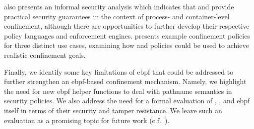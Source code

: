  also presents an informal security analysis which indicates that
\bpfbox{} and \bpfcontain{} provide practical security guarantees in the context of
process- and container-level confinement, although there are opportunities to further
develop their respective policy languages and enforcement engines. 
presents example confinement policies for three distinct use cases, examining how
\bpfbox{} and \bpfcontain{} policies could be used to achieve realistic confinement goals.

Finally, we identify some key limitations of \gls{ebpf} that could be addressed to further
strengthen an \gls{ebpf}-based confinement mechanism. Namely, we highlight the need for
new \gls{ebpf} helper functions to deal with pathname semantics in security policies.  We
also address the need for a formal evaluation of \bpfbox{}, \bpfcontain{}, and \gls{ebpf}
itself in terms of their security and tamper resistance. We leave such an evaluation as
a promising topic for future work (c.f.~).




